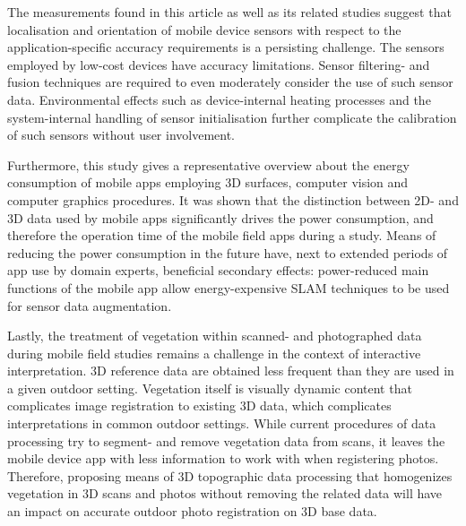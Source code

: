 \documentclass[review]{elsarticle}
\begin{document}
The measurements found in this article as well as its related studies suggest that localisation and orientation of mobile device sensors with respect to the application-specific accuracy requirements is a persisting challenge. The sensors employed by low-cost devices have accuracy limitations. Sensor filtering- and fusion techniques are required to even moderately consider the use of such sensor data. Environmental effects such as device-internal heating processes and the system-internal handling of sensor initialisation further complicate the calibration of such sensors without user involvement.

Furthermore, this study gives a representative overview about the energy consumption of mobile apps employing 3D surfaces, computer vision and computer graphics procedures. It was shown that the distinction between 2D- and 3D data used by mobile apps significantly drives the power consumption, and therefore the operation time of the mobile field apps during a study. Means of reducing the power consumption in the future have, next to extended periods of app use by domain experts, beneficial secondary effects: power-reduced main functions of the mobile app allow energy-expensive \gls{SLAM} techniques to be used for sensor data augmentation. %

Lastly, the treatment of vegetation within scanned- and photographed data during mobile field studies remains a challenge in the context of interactive interpretation. 3D reference data are obtained less frequent than they are used in a given outdoor setting. Vegetation itself is visually dynamic content that complicates image registration to existing 3D data, which complicates interpretations in common outdoor settings. While current procedures of data processing try to segment- and remove vegetation data from scans, it leaves the mobile device app with less information to work with when registering photos. Therefore, proposing means of 3D topographic data processing that homogenizes vegetation in 3D scans and photos without removing the related data will have an impact on accurate outdoor photo registration on 3D base data.

\end{document}
